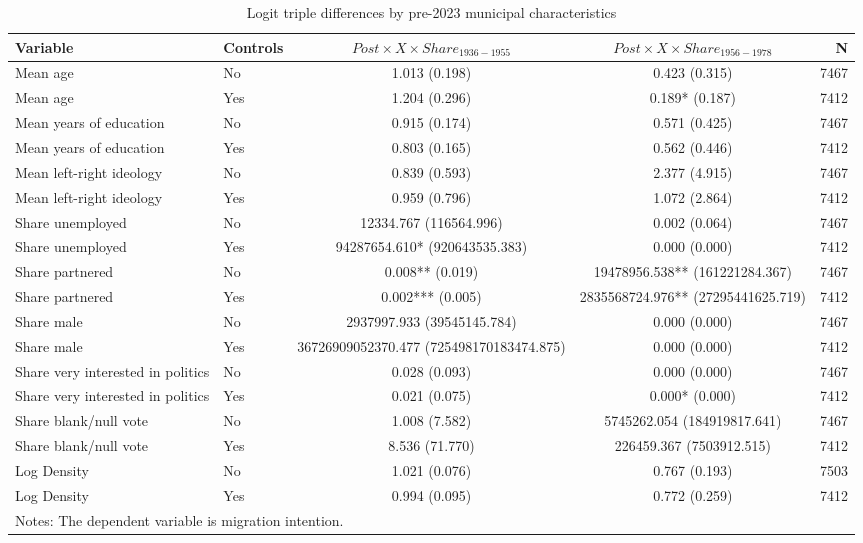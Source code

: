 \begin{table}[!htbp]
\centering
\caption{Logit triple differences by pre-2023 municipal characteristics}
\label{tab:logit_triple_differences_key}
\small
\begin{tabular}{llccr}
\hline
Variable & Controls & $Post \times X \times Share_{1936-1955}$ & $Post \times X \times Share_{1956-1978}$ & N \\
\hline
Mean age & No & 1.013 (0.198) & 0.423 (0.315) & 7467 \\
Mean age & Yes & 1.204 (0.296) & 0.189* (0.187) & 7412 \\
Mean years of education & No & 0.915 (0.174) & 0.571 (0.425) & 7467 \\
Mean years of education & Yes & 0.803 (0.165) & 0.562 (0.446) & 7412 \\
Mean left-right ideology & No & 0.839 (0.593) & 2.377 (4.915) & 7467 \\
Mean left-right ideology & Yes & 0.959 (0.796) & 1.072 (2.864) & 7412 \\
Share unemployed & No & 12334.767 (116564.996) & 0.002 (0.064) & 7467 \\
Share unemployed & Yes & 94287654.610* (920643535.383) & 0.000 (0.000) & 7412 \\
Share partnered & No & 0.008** (0.019) & 19478956.538** (161221284.367) & 7467 \\
Share partnered & Yes & 0.002*** (0.005) & 2835568724.976** (27295441625.719) & 7412 \\
Share male & No & 2937997.933 (39545145.784) & 0.000 (0.000) & 7467 \\
Share male & Yes & 36726909052370.477 (725498170183474.875) & 0.000 (0.000) & 7412 \\
Share very interested in politics & No & 0.028 (0.093) & 0.000 (0.000) & 7467 \\
Share very interested in politics & Yes & 0.021 (0.075) & 0.000* (0.000) & 7412 \\
Share blank/null vote & No & 1.008 (7.582) & 5745262.054 (184919817.641) & 7467 \\
Share blank/null vote & Yes & 8.536 (71.770) & 226459.367 (7503912.515) & 7412 \\
Log Density & No & 1.021 (0.076) & 0.767 (0.193) & 7503 \\
Log Density & Yes & 0.994 (0.095) & 0.772 (0.259) & 7412 \\
\hline
\multicolumn{5}{l}{\footnotesize Notes: The dependent variable is migration intention.} \\

\end{tabular}
\end{table}
